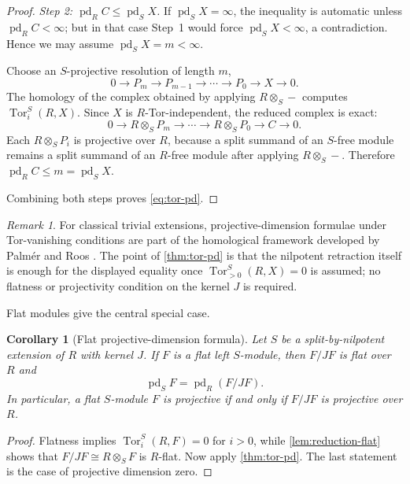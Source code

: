\documentclass[11pt,reqno]{amsart}
\newcommand{\pd}{\operatorname{pd}}
\newcommand{\Tor}{\operatorname{Tor}}
\theoremstyle{plain}
\newtheorem{corollary}[corollary]{Corollary}
\theoremstyle{definition}
\theoremstyle{remark}
\newtheorem{remark}[remark]{Remark}
\begin{document}
\begin{proof}
\smallskip
\noindent\emph{Step 2: $\pd_RC\le\pd_SX$.}
If $\pd_SX=\infty$, the inequality is automatic unless $\pd_RC<\infty$; but in
that case Step~1 would force $\pd_SX<\infty$, a contradiction.  Hence we may assume
$\pd_SX=m<\infty$.

Choose an $S$-projective resolution of length $m$,
\[
 0\longrightarrow P_m\longrightarrow P_{m-1}\longrightarrow\cdots
 \longrightarrow P_0\longrightarrow X\longrightarrow0.
\]
The homology of the complex obtained by applying $R\otimes_S-$ computes
$\Tor_i^S(R,X)$.  Since $X$ is $R$-Tor-independent, the reduced complex is exact:
\[
 0\longrightarrow R\otimes_SP_m\longrightarrow\cdots
 \longrightarrow R\otimes_SP_0\longrightarrow C\longrightarrow0.
\]
Each $R\otimes_SP_i$ is projective over $R$, because a split summand of an
$S$-free module remains a split summand of an $R$-free module after applying
$R\otimes_S-$.  Therefore $\pd_RC\le m=\pd_SX$.

Combining both steps proves \eqref{eq:tor-pd}.
\end{proof}

\begin{remark}\label{rem:compare-palmer}
For classical trivial extensions, projective-dimension formulae under Tor-vanishing
conditions are part of the homological framework developed by Palm\'er and Roos
\cite{PalmerRoos1973}.  The point of \cref{thm:tor-pd} is that the nilpotent
retraction itself is enough for the displayed equality once
$\Tor_{>0}^S(R,X)=0$ is assumed; no flatness or projectivity condition on the
kernel $J$ is required.
\end{remark}

Flat modules give the central special case.

\begin{corollary}[Flat projective-dimension formula]\label{cor:flat-pd}
Let $S$ be a split-by-nilpotent extension of $R$ with kernel $J$.  If $F$ is a flat
left $S$-module, then $F/JF$ is flat over $R$ and
\begin{equation}\label{eq:flat-pd}
   {\ \pd_SF=\pd_R(F/JF).\ }
\end{equation}
In particular, a flat $S$-module $F$ is projective if and only if $F/JF$ is
projective over $R$.
\end{corollary}

\begin{proof}
Flatness implies $\Tor_i^S(R,F)=0$ for $i>0$, while
\cref{lem:reduction-flat} shows that $F/JF\cong R\otimes_SF$ is $R$-flat.
Now apply \cref{thm:tor-pd}.  The last statement is the case of projective
dimension zero.
\end{proof}
\end{document}
